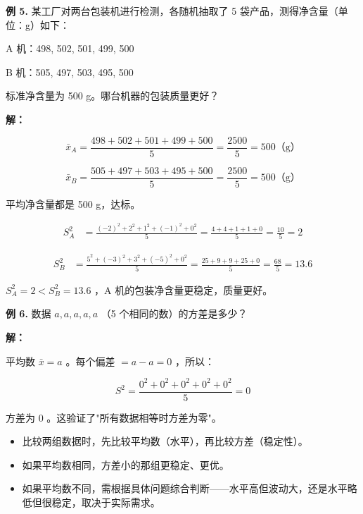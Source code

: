 \begin{workedexamples}


\textbf{例 5.} 某工厂对两台包装机进行检测，各随机抽取了 5 袋产品，测得净含量（单位：g）如下：

A 机：498, 502, 501, 499, 500

B 机：505, 497, 503, 495, 500

标准净含量为 500 g。哪台机器的包装质量更好？

\textbf{解：}

\[
\bar{x}_A = \frac{498 + 502 + 501 + 499 + 500}{5} = \frac{2500}{5} = 500 \text{（g）}
\]


\[
\bar{x}_B = \frac{505 + 497 + 503 + 495 + 500}{5} = \frac{2500}{5} = 500 \text{（g）}
\]


平均净含量都是 500 g，达标。

\[
\begin{aligned}
S^2_A &= \frac{(-2)^2 + 2^2 + 1^2 + (-1)^2 + 0^2}{5} = \frac{4 + 4 + 1 + 1 + 0}{5} = \frac{10}{5} = 2
\end{aligned}
\]


\[
\begin{aligned}
S^2_B &= \frac{5^2 + (-3)^2 + 3^2 + (-5)^2 + 0^2}{5} = \frac{25 + 9 + 9 + 25 + 0}{5} = \frac{68}{5} = 13.6
\end{aligned}
\]


$S^2_A = 2 < S^2_B = 13.6$ ，A 机的包装净含量更稳定，质量更好。

\textbf{例 6.} 数据 $a, a, a, a, a$ （5 个相同的数）的方差是多少？

\textbf{解：}

平均数 $\bar{x} = a$ 。每个偏差 $= a - a = 0$ ，所以：

\[
S^2 = \frac{0^2 + 0^2 + 0^2 + 0^2 + 0^2}{5} = 0
\]


方差为 $0$ 。这验证了"所有数据相等时方差为零"。

\end{workedexamples}

\begin{keytakeaway}


\begin{itemize}
  \item 比较两组数据时，先比较平均数（水平），再比较方差（稳定性）。
  \item 如果平均数相同，方差小的那组更稳定、更优。
  \item 如果平均数不同，需根据具体问题综合判断——水平高但波动大，还是水平略低但很稳定，取决于实际需求。
\end{itemize}


\end{keytakeaway}

